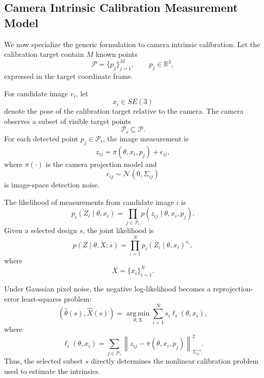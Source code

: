 \documentclass[letterpaper, 9
 pt, conference]{ieeeconf}
\begin{document}
\subsection{Camera Intrinsic Calibration Measurement Model}
\label{subsec:camera_measurement_model}

We now specialize the generic formulation to camera intrinsic calibration. Let the calibration target contain $M$ known points
\begin{equation}
    \mathcal{P}=\{p_j\}_{j=1}^{M},
    \qquad
    p_j\in\mathbb{R}^{3},
\end{equation}
expressed in the target coordinate frame.

For candidate image $v_i$, let
\begin{equation}
    x_i\in SE(3)
\end{equation}
denote the pose of the calibration target relative to the camera. The camera observes a subset of visible target points
\begin{equation}
    \mathcal{P}_i\subseteq\mathcal{P}.
\end{equation}
For each detected point $p_j\in\mathcal{P}_i$, the image measurement is
\begin{equation}
    z_{ij}
    =
    \pi(\theta,x_i,p_j)+\epsilon_{ij},
\end{equation}
where $\pi(\cdot)$ is the camera projection model and
\begin{equation}
    \epsilon_{ij}\sim\mathcal{N}(0,\Sigma_{ij})
\end{equation}
is image-space detection noise.

The likelihood of measurements from candidate image $i$ is
\begin{equation}
    p_i(Z_i\mid \theta,x_i)
    =
    \prod_{j\in\mathcal{P}_i}
    p(z_{ij}\mid \theta,x_i,p_j).
\end{equation}
Given a selected design $s$, the joint likelihood is
\begin{equation}
    p(Z\mid \theta,X;s)
    =
    \prod_{i=1}^{N}
    p_i(Z_i\mid \theta,x_i)^{s_i},
\end{equation}
where
\begin{equation}
    X=\{x_i\}_{i=1}^{N}.
\end{equation}

Under Gaussian pixel noise, the negative log-likelihood becomes a reprojection-error least-squares problem:
\begin{equation}
    (\hat{\theta}(s),\hat{X}(s))
    =
    \operatorname*{arg\,min}_{\theta,X}
    \sum_{i=1}^{N}
    s_i\ell_i(\theta,x_i),
\end{equation}
where
\begin{equation}
    \ell_i(\theta,x_i)
    =
    \sum_{j\in\mathcal{P}_i}
    \left\|
    z_{ij}
    -
    \pi(\theta,x_i,p_j)
    \right\|_{\Sigma_{ij}^{-1}}^{2}.
\end{equation}
Thus, the selected subset $s$ directly determines the nonlinear calibration problem used to estimate the intrinsics.
\end{document}
